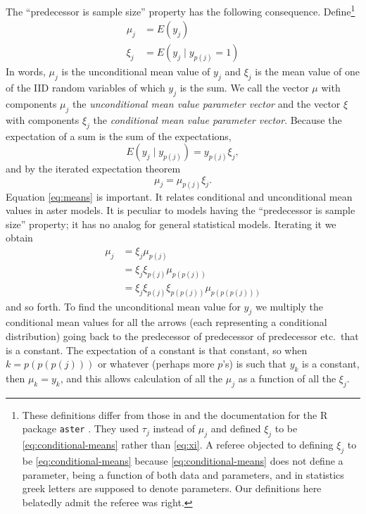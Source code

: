 \documentclass[11pt]{article}
\begin{document}
The ``predecessor is sample size'' property has the following consequence.
Define\footnote{These definitions differ from those in \citet{gws} and the
documentation for the R package \texttt{aster} \citep{package}.  They used
$\tau_j$ instead of $\mu_j$ and defined $\xi_j$ to
be \eqref{eq:conditional-means} rather than \eqref{eq:xi}.  A referee objected
to defining $\xi_j$ to be \eqref{eq:conditional-means} because
\eqref{eq:conditional-means} does not define a parameter, being a function
of both data and parameters, and in statistics greek letters are supposed to
denote parameters.  Our definitions here belatedly admit the referee was right.}
\begin{subequations}
\begin{align}
   \mu_j & = E(y_j)
   \\
   \xi_j & = E(y_j \mid y_{p(j)} = 1)
   \label{eq:xi}
\end{align}
\end{subequations}
In words, $\mu_j$ is the unconditional mean value of $y_j$ and $\xi_j$ is
the mean value of one of the IID random variables of which $y_j$
is the sum.  We call the vector $\mu$ with components $\mu_j$ the
\emph{unconditional mean value parameter vector}
and the vector $\xi$ with components $\xi_j$
the \emph{conditional mean value parameter vector}.
Because the expectation of a sum is
the sum of the expectations,
\begin{equation} \label{eq:conditional-means}
   E(y_j \mid y_{p(j)}) = y_{p(j)} \xi_j,
\end{equation}
and by the iterated expectation theorem
\begin{equation} \label{eq:means}
   \mu_j = \mu_{p(j)} \xi_j.
\end{equation}
Equation \eqref{eq:means} is important.  It relates conditional
and unconditional mean values in aster models.  It is peculiar to models
having the ``predecessor is sample size'' property; it has no analog
for general statistical models.  Iterating it we obtain
\begin{equation} \label{eq:xi-to-mu}
\begin{split}
   \mu_j & = \xi_j \mu_{p(j)}
   \\
   & = \xi_j \xi_{p(j)} \mu_{p(p(j))}
   \\
   & = \xi_j \xi_{p(j)} \xi_{p(p(j))} \mu_{p(p(p(j)))}
\end{split}
\end{equation}
and so forth.  To find the unconditional mean value for $y_j$ we multiply
the conditional mean values for all the arrows (each representing a conditional
distribution) going back to the predecessor of predecessor of predecessor etc.\
that is a constant.  The expectation of a constant is that constant, so
when $k = p(p(p(j)))$ or whatever (perhaps more $p$'s) is such that $y_k$ is
a constant, then $\mu_k = y_k$, and this allows
calculation of all the $\mu_j$ as a function of all the $\xi_j$.
\end{document}
